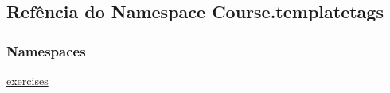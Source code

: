 \hypertarget{namespaceCourse_1_1templatetags}{}\subsection{Refência do Namespace Course.\+templatetags}
\label{namespaceCourse_1_1templatetags}
\subsubsection*{Namespaces}
\begin{DoxyCompactItemize}
\item 
 \hyperlink{namespaceCourse_1_1templatetags_1_1exercises}{exercises}
\end{DoxyCompactItemize}
